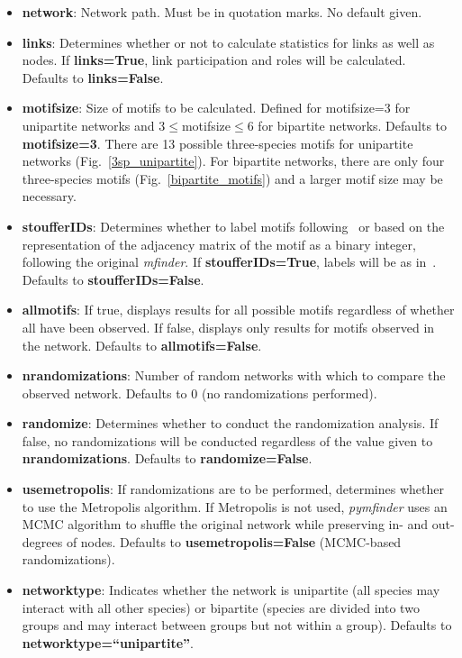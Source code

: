 \documentclass[12pt]{article}
\begin{document}
     	\begin{itemize}

     		\item \textbf{network}: Network path. Must be in quotation marks. No default given.

				\item \textbf{links}: Determines whether or not to calculate statistics for links as well as nodes. If \textbf{links=True}, link participation and roles will be calculated. Defaults to \textbf{links=False}.

				\item \textbf{motifsize}: Size of motifs to be calculated. Defined for motifsize=3 for unipartite networks and 3$\leq$motifsize$\leq$6 for bipartite networks. Defaults to \textbf{motifsize=3}. There are 13 possible three-species motifs for unipartite networks (Fig.~\ref{3sp_unipartite}). For bipartite networks, there are only four three-species motifs (Fig.~\ref{bipartite_motifs}) and a larger motif size may be necessary.

				\item \textbf{stoufferIDs}: Determines whether to label motifs following~\citet{Stouffer2007} or based on the representation of the adjacency matrix of the motif as a binary integer, following the original \emph{mfinder}. If \textbf{stoufferIDs=True}, labels will be as in~\citet{Stouffer2007}. Defaults to \textbf{stoufferIDs=False}.

				\item \textbf{allmotifs}: If true, displays results for all possible motifs regardless of whether all have been observed. If false, displays only results for motifs observed in the network. Defaults to \textbf{allmotifs=False}.

				\item \textbf{nrandomizations}: Number of random networks with which to compare the observed network. Defaults to 0 (no randomizations performed).

				\item \textbf{randomize}: Determines whether to conduct the randomization analysis. If false, no randomizations will be conducted regardless of the value given to \textbf{nrandomizations}. Defaults to \textbf{randomize=False}.

				\item \textbf{usemetropolis}: If randomizations are to be performed, determines whether to use the Metropolis algorithm. If Metropolis is not used, \emph{pymfinder} uses an MCMC algorithm to shuffle the original network while preserving in- and out-degrees of nodes. Defaults to \textbf{usemetropolis=False} (MCMC-based randomizations).

				\item \textbf{networktype}: Indicates whether the network is unipartite (all species may interact with all other species) or bipartite (species are divided into two groups and may interact between groups but not within a group). Defaults to \textbf{networktype=``unipartite''}.

			\end{itemize}
\end{document}
